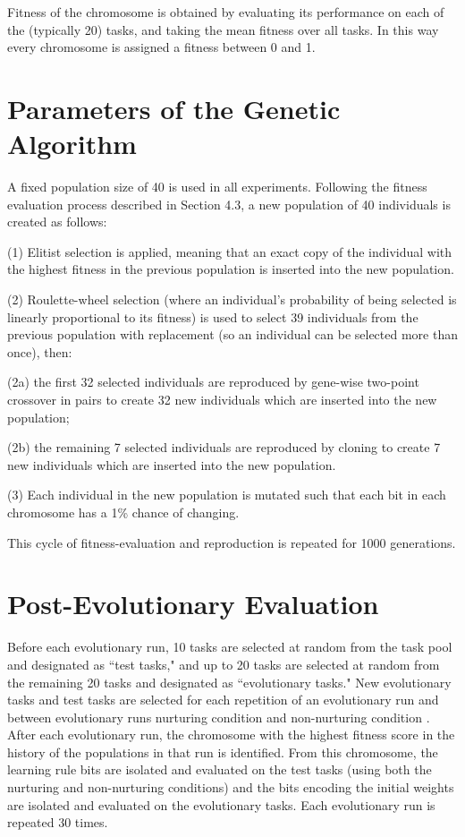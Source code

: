 \documentclass[master]{outhesis}
\begin{document}
Fitness of the chromosome is obtained by evaluating its performance on each of the (typically 20) tasks, and taking the mean fitness over all tasks. In this way every chromosome is assigned a fitness between 0 and 1.

\section{Parameters of the Genetic Algorithm}


A fixed population size of 40 is used in all experiments. Following the fitness evaluation process described in Section 4.3, a new population of 40 individuals is created as follows:

(1) Elitist selection is applied, meaning that an exact copy of the individual with the highest fitness in the previous population is inserted into the new population.

(2) Roulette-wheel selection (where an individual's probability of being selected is linearly proportional to its fitness) is used to select 39 individuals from the previous population with replacement (so an individual can be selected more than once), then:

(2a) the first 32 selected individuals are reproduced by gene-wise two-point crossover in pairs to create 32 new individuals which are inserted into the new population;

(2b) the remaining 7 selected individuals are reproduced by cloning to create 7 new individuals which are inserted into the new population.

(3) Each individual in the new population is mutated such that each bit in each chromosome has a 1\% chance of changing.

This cycle of fitness-evaluation and reproduction is repeated for 1000 generations.


\section{Post-Evolutionary Evaluation}

Before each evolutionary run, 10 tasks are selected at random from the task pool and designated as ``test tasks,"
and up to 20 tasks are selected at random from the remaining 20 tasks and designated as ``evolutionary tasks."
New evolutionary tasks and test tasks are selected for each repetition of an evolutionary run and between evolutionary runs  nurturing condition and non-nurturing condition .
After each evolutionary run, the chromosome with the highest fitness score in the history of the populations in that run is identified.
From this chromosome, the learning rule bits are isolated and evaluated on the test tasks (using both the nurturing and non-nurturing conditions) and the bits encoding the initial weights are isolated and evaluated on the evolutionary tasks.
Each evolutionary run is repeated 30 times.
\end{document}

